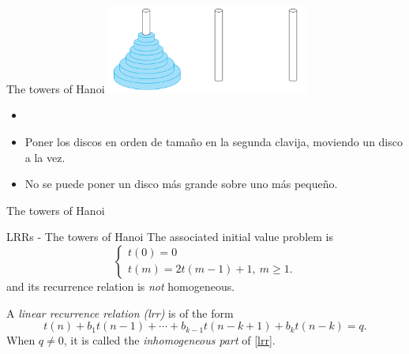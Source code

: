 \documentclass{beamer}
\begin{document}
\begin{frame}{The towers of Hanoi}
	\includegraphics[width=0.5\textwidth]{hanoi.png}

	\begin{itemize}
		\item[]
		\item Poner los discos en orden de tamaño en la segunda clavija,
			moviendo un disco a la vez.
		\item No se puede poner un disco más grande sobre uno más pequeño.
	\end{itemize}
\end{frame}

%

\begin{frame}{The towers of Hanoi}
	
\end{frame}

%

\begin{frame}{LRRs - The towers of Hanoi}
	The associated initial value problem is
	\begin{displaymath}
		\begin{cases}
			t(0)= 0\\
			t(m)= 2t(m-1) + 1,\ m \geq 1.
		\end{cases}
	\end{displaymath}
	and its recurrence relation is \emph{not} homogeneous.
	\begin{defn}
		A \emph{linear recurrence relation (lrr)} is of the form
		\begin{equation}\label{lrr}
			t(n) + b_1t(n-1) + \cdots + b_{k-1}t(n-k+1) + b_kt(n-k)= q.
		\end{equation}
		When $q \neq 0$, it is called the \emph{inhomogeneous part} of \eqref{lrr}.
	\end{defn}
\end{frame}

%
\end{document}
